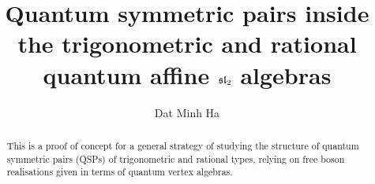 

\setcounter{section}{-1}





    \title{Quantum symmetric pairs inside the trigonometric and rational quantum affine $\sl_2$ algebras}
    
    \author{Dat Minh Ha}
    \maketitle
    
    \begin{abstract}
        This is a proof of concept for a general strategy of studying the structure of quantum symmetric pairs (QSPs) of trigonometric and rational types, relying on free boson realisations given in terms of quantum vertex algebras.  
    \end{abstract}
    
    {
    \hypersetup{} 
    \tableofcontents %
    }

    

    

    

    
    
    \printbibliography

